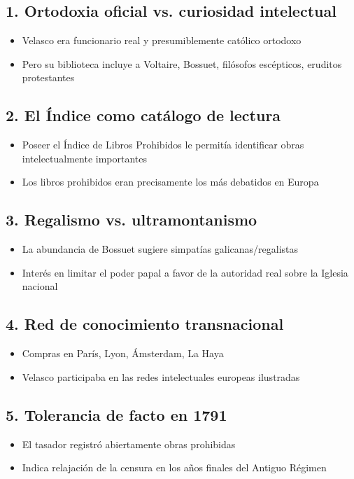 \documentclass[12pt,a4paper]{article}
\begin{document}
\subsection*{1. Ortodoxia oficial vs. curiosidad intelectual}
\begin{itemize}
    \item Velasco era funcionario real y presumiblemente católico ortodoxo
    \item Pero su biblioteca incluye a Voltaire, Bossuet, filósofos escépticos, eruditos protestantes
\end{itemize}

\subsection*{2. El Índice como catálogo de lectura}
\begin{itemize}
    \item Poseer el Índice de Libros Prohibidos le permitía identificar obras intelectualmente importantes
    \item Los libros prohibidos eran precisamente los más debatidos en Europa
\end{itemize}

\subsection*{3. Regalismo vs. ultramontanismo}
\begin{itemize}
    \item La abundancia de Bossuet sugiere simpatías galicanas/regalistas
    \item Interés en limitar el poder papal a favor de la autoridad real sobre la Iglesia nacional
\end{itemize}

\subsection*{4. Red de conocimiento transnacional}
\begin{itemize}
    \item Compras en París, Lyon, Ámsterdam, La Haya
    \item Velasco participaba en las redes intelectuales europeas ilustradas
\end{itemize}

\subsection*{5. Tolerancia de facto en 1791}
\begin{itemize}
    \item El tasador registró abiertamente obras prohibidas
    \item Indica relajación de la censura en los años finales del Antiguo Régimen
\end{itemize}
\end{document}
